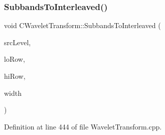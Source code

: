 \subsubsection{\texorpdfstring{SubbandsToInterleaved()}{SubbandsToInterleaved()}}
{\footnotesize\ttfamily void C\+Wavelet\+Transform\+::\+Subbands\+To\+Interleaved (\begin{DoxyParamCaption}\item[{int}]{src\+Level,  }\item[{\mbox{\hyperlink{PGFtypes_8h_acb1ee3f52ccfad782dcaa0abd79e5d05}{DataT}} $\ast$}]{lo\+Row,  }\item[{\mbox{\hyperlink{PGFtypes_8h_acb1ee3f52ccfad782dcaa0abd79e5d05}{DataT}} $\ast$}]{hi\+Row,  }\item[{U\+I\+N\+T32}]{width }\end{DoxyParamCaption})\hspace{0.3cm}{\ttfamily [private]}}



Definition at line 444 of file Wavelet\+Transform.\+cpp.


